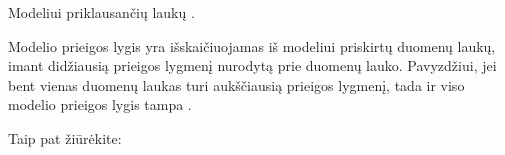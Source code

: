 \documentclass[letterpaper,10pt,lithuanian]{sphinxmanual}
\begin{document}
\begin{fulllineitems}
\label{\detokenize{dimensijos:model.access}}
\pysigstartsignatures
{}
\pysigstopsignatures
\sphinxAtStartPar
Modeliui priklausančių laukų {\hyperref[\detokenize{prieiga:access}]{}}.

\sphinxAtStartPar
Modelio prieigos lygis yra išskaičiuojamas iš modeliui priskirtų duomenų laukų, imant didžiausią prieigos lygmenį nurodytą prie duomenų lauko. Pavyzdžiui, jei bent vienas duomenų laukas turi aukščiausią  prieigos lygmenį, tada ir viso modelio prieigos lygis tampa .


\begin{sphinxseealso}{Taip pat žiūrėkite:}

\sphinxAtStartPar
{\hyperref[\detokenize{prieiga:access}]{}}


\end{sphinxseealso}


\end{fulllineitems}

\end{document}
